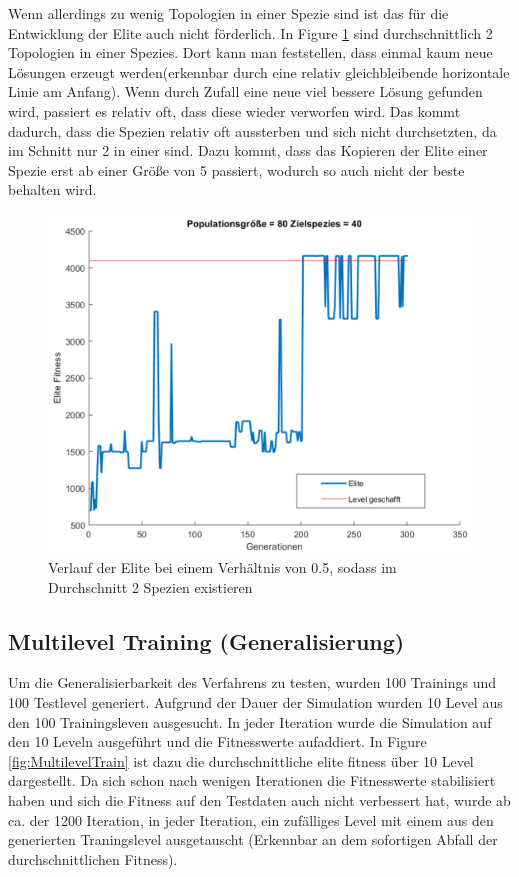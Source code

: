 \documentclass{hbrs-ecta-report}
\begin{document}
Wenn allerdings zu wenig Topologien in einer Spezie sind ist das für die Entwicklung der Elite auch nicht förderlich. In Figure \ref{fig:Verhaeltniss0_5} sind durchschnittlich 2 Topologien in einer Spezies. Dort kann man feststellen, dass einmal kaum neue Lösungen erzeugt werden(erkennbar durch eine relativ gleichbleibende horizontale Linie am Anfang). Wenn durch Zufall eine neue viel bessere Lösung gefunden wird, passiert es relativ oft, dass diese wieder verworfen wird. Das kommt dadurch, dass die Spezien relativ oft aussterben und sich nicht durchsetzten, da im Schnitt nur 2 in einer sind. Dazu kommt, dass das Kopieren der Elite einer Spezie erst ab einer Größe von 5 passiert, wodurch so auch nicht der beste behalten wird.\\
 
\begin{figure}[h!]
\centering
\includegraphics[width=\linewidth]{img/Mario_80_Netze_target_40.png}
\caption{Verlauf der Elite bei einem Verhältnis von 0.5, sodass im Durchschnitt 2 Spezien existieren}
\label{fig:Verhaeltniss0_5} 
\end{figure}

\newpage

\subsection{Multilevel Training (Generalisierung)}
Um die Generalisierbarkeit des Verfahrens zu testen, wurden 100 Trainings und 100 Testlevel generiert.
Aufgrund der Dauer der Simulation wurden 10 Level aus den 100 Trainingsleven ausgesucht. In jeder Iteration wurde die Simulation auf den 10 Leveln ausgeführt und die Fitnesswerte aufaddiert. \newline In Figure \ref{fig:MultilevelTrain} ist dazu die durchschnittliche elite fitness über 10 Level dargestellt.
Da sich schon nach wenigen Iterationen die Fitnesswerte stabilisiert haben und sich die Fitness auf den Testdaten auch nicht verbessert hat, wurde ab ca. der  1200 Iteration, in jeder Iteration, ein zufälliges Level mit einem aus den generierten Traningslevel ausgetauscht (Erkennbar an dem sofortigen Abfall der durchschnittlichen Fitness). \newline
\end{document}
